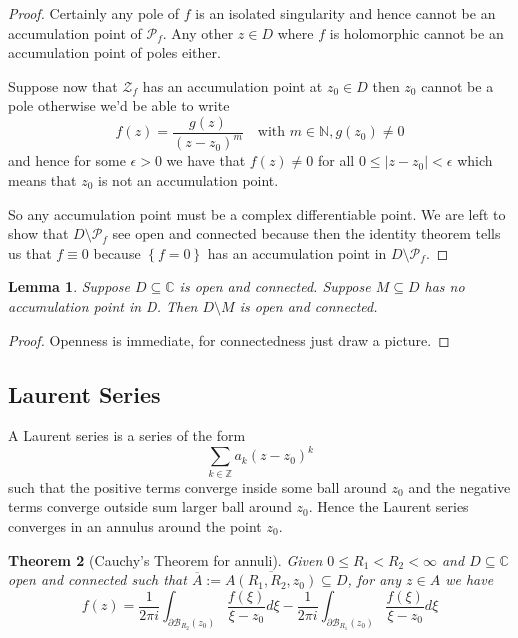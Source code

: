 \documentclass[11pt]{article}
\newcommand{\defeq}{:=}
\newcommand{\abs}[1]{\left|#1\right|}
\newcommand{\C}{\mathbb{C}}
\newcommand{\Z}{\mathbb{Z}}
\newcommand{\N}{\mathbb{N}}
\newenvironment{defin}
	{\begin{mdframed}[backgroundcolor=white, roundcorner=5pt, linewidth=1pt]}
	{\end{mdframed}}
\newcommand{\mdf}[1]{{\color{red} #1}}
\newtheorem{theorem}{Theorem}[section]
\newtheorem{lemma}[theorem]{Lemma}
\begin{document}
\begin{proof}
Certainly any pole of $f$ is an isolated singularity and hence cannot be an accumulation point of $\mathcal{P}_f$.
Any other $z\in D$ where $f$ is holomorphic cannot be an accumulation point of poles either.

Suppose now that $\mathcal{Z}_f$ has an accumulation point at $z_0\in D$ then $z_0$ cannot be a pole otherwise we'd be able to write
\[
	f(z)=\frac{g(z)}{(z-z_0)^m}\quad\text{with }m\in\N, g(z_0)\neq 0
\]
and hence for some $\epsilon>0$ we have that $f(z)\neq 0$ for all $0\leq\abs{z-z_0}<\epsilon$ which means that $z_0$ is not an accumulation point.

So any accumulation point must be a complex differentiable point.
We are left to show that $D\setminus\mathcal{P}_f$ see open and connected because then the identity theorem tells us that $f\equiv 0$ because $\left\{ f=0\right\}$ has an accumulation point in $D \setminus \mathcal{P}_f$.
\end{proof}

\begin{lemma}
Suppose $D\subseteq\C$ is open and connected.
Suppose $M\subseteq D$ has no accumulation point in D.
Then $D\setminus M$ is open and connected.
\end{lemma}

\begin{proof}
Openness is immediate, for connectedness just draw a picture.
\end{proof}

\subsection{Laurent Series}
\begin{defin}
	A \mdf{Laurent series} is a series of the form
	\[
		\sum_{k\in\Z}a_k(z-z_0)^k
	\]
	such that the positive terms converge inside some ball around $z_0$ and the negative terms converge outside sum larger ball around $z_0$.
	Hence the Laurent series converges in an annulus around the point $z_0$.
\end{defin}

\begin{theorem}[Cauchy's Theorem for annuli]
Given $0\leq R_1 < R_2 < \infty$ and $D\subseteq\C$ open and connected such that $\overline{A}\defeq\overline{A(R_1, R_2, z_0)}\subseteq D$, for any $z\in A$ we have
\[
	f(z) = \frac{1}{2\pi i}\int_{\partial \mathcal{B}_{R_2}(z_0)}\frac{f(\xi)}{\xi-z_0}d\xi - \frac{1}{2\pi i}\int_{\partial \mathcal{B}_{R_1}(z_0)}\frac{f(\xi)}{\xi-z_0}d\xi
\]
\end{theorem}
\end{document}
